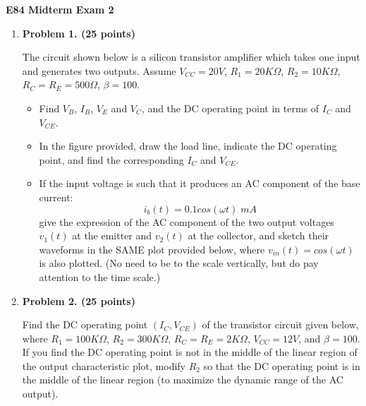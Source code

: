 \usepackage{html}

\begin{center}
{\Large \bf E84 Midterm Exam 2}
\end{center}


\begin{enumerate}

\item {\bf Problem 1. (25 points)} 


The circuit shown below is a silicon transistor amplifier which takes one
input and generates two outputs. Assume $V_{CC}=20V$, $R_1=20K\Omega$,
$R_2=10K\Omega$, $R_C=R_E=500\Omega$, $\beta=100$. 

\begin{itemize}
\item Find $V_B$, $I_B$, $V_E$ and $V_C$, and the DC operating point in 
terms of $I_C$ and $V_{CE}$. 
\item In the figure provided, draw the load line, indicate the DC operating 
point, and find the corresponding $I_C$ and $V_{CE}$.
\item If the input voltage is such that it produces an AC component of the 
base current:
\[	i_b(t)=0.1 cos(\omega t) \; mA	\]
give the expression of the AC component of the two output voltages $v_1(t)$ 
at the emitter and $v_2(t)$ at the collector, and sketch their waveforms in 
the SAME plot provided below, where $v_{in}(t)=cos(\omega t)$ is also plotted.
(No need to be to the scale vertically, but do pay attention to the time
scale.)
\end{itemize}




\item {\bf Problem 2. (25 points)} 

Find the DC operating point $(I_C, V_{CE})$ of the transistor circuit 
given below, where $R_1=100K\Omega$, $R_2=300K\Omega$, $R_C=R_E=2K\Omega$, 
$V_{CC}=12V$, and $\beta=100$. If you find the DC operating point is not 
in the middle of the linear region of the output characteristic plot, 
modify $R_2$ so that the DC operating point is in the middle of the linear
region (to maximize the dynamic range of the AC output).


\end{enumerate}
